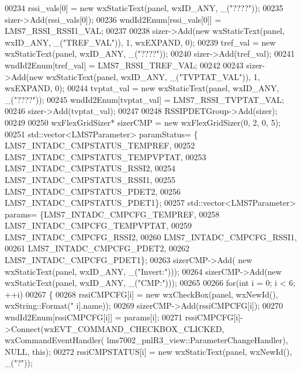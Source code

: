 \begin{DoxyCode}
00234             rssi\_vals[0] = \textcolor{keyword}{new} wxStaticText(panel, wxID\_ANY, \_(\textcolor{stringliteral}{"????"}));
00235             sizer->Add(rssi\_vals[0]);
00236             wndId2Enum[rssi\_vals[0]] = LMS7_RSSI_RSSI1_VAL;
00237 
00238             sizer->Add(\textcolor{keyword}{new} wxStaticText(panel, wxID\_ANY, \_(\textcolor{stringliteral}{"TREF\_VAL"})), 1, wxEXPAND, 0);
00239             tref_val = \textcolor{keyword}{new} wxStaticText(panel, wxID\_ANY, \_(\textcolor{stringliteral}{"????"}));
00240             sizer->Add(tref_val);
00241             wndId2Enum[tref_val] = LMS7_RSSI_TREF_VAL;
00242 
00243             sizer->Add(\textcolor{keyword}{new} wxStaticText(panel, wxID\_ANY, \_(\textcolor{stringliteral}{"TVPTAT\_VAL"})), 1, wxEXPAND, 0);
00244             tvptat_val = \textcolor{keyword}{new} wxStaticText(panel, wxID\_ANY, \_(\textcolor{stringliteral}{"????"}));
00245             wndId2Enum[tvptat_val] = LMS7_RSSI_TVPTAT_VAL;
00246             sizer->Add(tvptat_val);
00247 
00248             RSSIPDETGroup->Add(sizer);
00249 
00250             wxFlexGridSizer* sizerCMP = \textcolor{keyword}{new} wxFlexGridSizer(0, 2, 0, 5);
00251             std::vector<LMS7Parameter> paramStatus= \{
      LMS7_INTADC_CMPSTATUS_TEMPREF,
00252 LMS7_INTADC_CMPSTATUS_TEMPVPTAT,
00253 LMS7_INTADC_CMPSTATUS_RSSI2,
00254 LMS7_INTADC_CMPSTATUS_RSSI1,
00255 LMS7_INTADC_CMPSTATUS_PDET2,
00256 LMS7_INTADC_CMPSTATUS_PDET1\};
00257 std::vector<LMS7Parameter> params= \{LMS7_INTADC_CMPCFG_TEMPREF,
00258 LMS7_INTADC_CMPCFG_TEMPVPTAT,
00259 LMS7_INTADC_CMPCFG_RSSI2,
00260 LMS7_INTADC_CMPCFG_RSSI1,
00261 LMS7_INTADC_CMPCFG_PDET2,
00262 LMS7_INTADC_CMPCFG_PDET1\};
00263             sizerCMP->Add( \textcolor{keyword}{new} wxStaticText(panel, wxID\_ANY, \_(\textcolor{stringliteral}{"Invert:"})));
00264             sizerCMP->Add(\textcolor{keyword}{new} wxStaticText(panel, wxID\_ANY, \_(\textcolor{stringliteral}{"CMP:"})));
00265 
00266             \textcolor{keywordflow}{for}(\textcolor{keywordtype}{int} i = 0; i < 6; ++i)
00267             \{
00268                 rssiCMPCFG[i] = \textcolor{keyword}{new} wxCheckBox(panel, wxNewId(), wxString::Format(\textcolor{stringliteral}{"%
      i].name));
00269                 sizerCMP->Add(rssiCMPCFG[i]);
00270                 wndId2Enum[rssiCMPCFG[i]] = params[i];
00271                 rssiCMPCFG[i]->Connect(wxEVT\_COMMAND\_CHECKBOX\_CLICKED, wxCommandEventHandler(
      lms7002_pnlR3_view::ParameterChangeHandler), NULL, \textcolor{keyword}{this});
00272                 rssiCMPSTATUS[i] = \textcolor{keyword}{new} wxStaticText(panel, wxNewId(), \_(\textcolor{stringliteral}{"?"}));
}
\end{DoxyCode}
